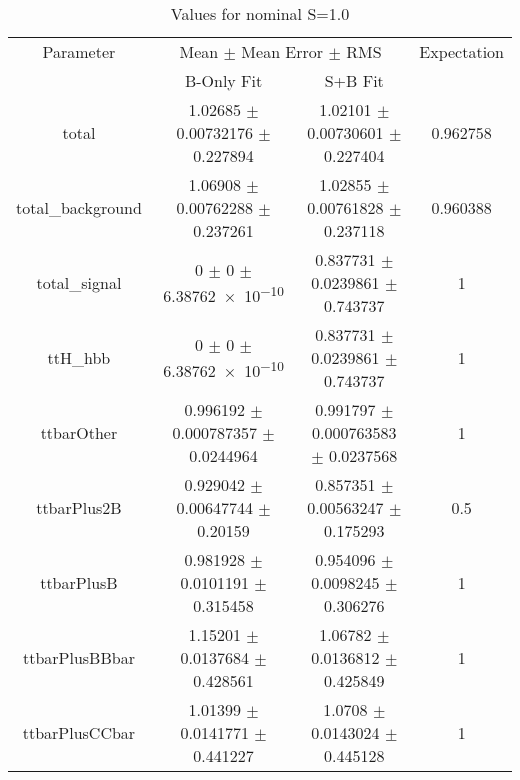 \begin{table}
\centering
\caption{Values for nominal S=1.0}
\begin{tabular}{cccc}
\toprule
Parameter & \multicolumn{2}{c}{Mean $\pm$ Mean Error $\pm$ RMS} & Expectation\\
 & B-Only Fit & S+B Fit & \\
\midrule
total & \num{1.02685} $\pm$ \num{0.00732176} $\pm$ \num{0.227894} & \num{1.02101} $\pm$ \num{0.00730601} $\pm$ \num{0.227404} & \num{0.962758}\\
total\_background & \num{1.06908} $\pm$ \num{0.00762288} $\pm$ \num{0.237261} & \num{1.02855} $\pm$ \num{0.00761828} $\pm$ \num{0.237118} & \num{0.960388}\\
total\_signal & \num{0} $\pm$ \num{0} $\pm$ \num{6.38762e-10} & \num{0.837731} $\pm$ \num{0.0239861} $\pm$ \num{0.743737} & \num{1}\\
ttH\_hbb & \num{0} $\pm$ \num{0} $\pm$ \num{6.38762e-10} & \num{0.837731} $\pm$ \num{0.0239861} $\pm$ \num{0.743737} & \num{1}\\
ttbarOther & \num{0.996192} $\pm$ \num{0.000787357} $\pm$ \num{0.0244964} & \num{0.991797} $\pm$ \num{0.000763583} $\pm$ \num{0.0237568} & \num{1}\\
ttbarPlus2B & \num{0.929042} $\pm$ \num{0.00647744} $\pm$ \num{0.20159} & \num{0.857351} $\pm$ \num{0.00563247} $\pm$ \num{0.175293} & \num{0.5}\\
ttbarPlusB & \num{0.981928} $\pm$ \num{0.0101191} $\pm$ \num{0.315458} & \num{0.954096} $\pm$ \num{0.0098245} $\pm$ \num{0.306276} & \num{1}\\
ttbarPlusBBbar & \num{1.15201} $\pm$ \num{0.0137684} $\pm$ \num{0.428561} & \num{1.06782} $\pm$ \num{0.0136812} $\pm$ \num{0.425849} & \num{1}\\
ttbarPlusCCbar & \num{1.01399} $\pm$ \num{0.0141771} $\pm$ \num{0.441227} & \num{1.0708} $\pm$ \num{0.0143024} $\pm$ \num{0.445128} & \num{1}\\
\bottomrule
\end{tabular}
\end{table}